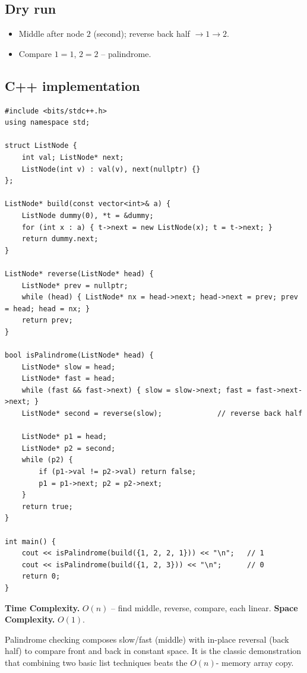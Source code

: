 \subsection*{Dry run}


\begin{itemize}
  \item Middle after node $2$ (second); reverse back half $\to1\to2$.
  \item Compare $1{=}1$, $2{=}2$ -- palindrome.
\end{itemize}

\subsection*{C++ implementation}

\begin{lstlisting}
#include <bits/stdc++.h>
using namespace std;

struct ListNode {
    int val; ListNode* next;
    ListNode(int v) : val(v), next(nullptr) {}
};

ListNode* build(const vector<int>& a) {
    ListNode dummy(0), *t = &dummy;
    for (int x : a) { t->next = new ListNode(x); t = t->next; }
    return dummy.next;
}

ListNode* reverse(ListNode* head) {
    ListNode* prev = nullptr;
    while (head) { ListNode* nx = head->next; head->next = prev; prev = head; head = nx; }
    return prev;
}

bool isPalindrome(ListNode* head) {
    ListNode* slow = head;
    ListNode* fast = head;
    while (fast && fast->next) { slow = slow->next; fast = fast->next->next; }
    ListNode* second = reverse(slow);             // reverse back half

    ListNode* p1 = head;
    ListNode* p2 = second;
    while (p2) {
        if (p1->val != p2->val) return false;
        p1 = p1->next; p2 = p2->next;
    }
    return true;
}

int main() {
    cout << isPalindrome(build({1, 2, 2, 1})) << "\n";   // 1
    cout << isPalindrome(build({1, 2, 3})) << "\n";      // 0
    return 0;
}
\end{lstlisting}

\begin{complexitybox}
\textbf{Time Complexity.} $O(n)$ -- find middle, reverse, compare, each
linear. \textbf{Space Complexity.} $O(1)$.
\end{complexitybox}

\begin{takeawaybox}
Palindrome checking composes slow/fast (middle) with in-place reversal
(back half) to compare front and back in constant space. It is the classic
demonstration that combining two basic list techniques beats the $O(n)$-
memory array copy.
\end{takeawaybox}
